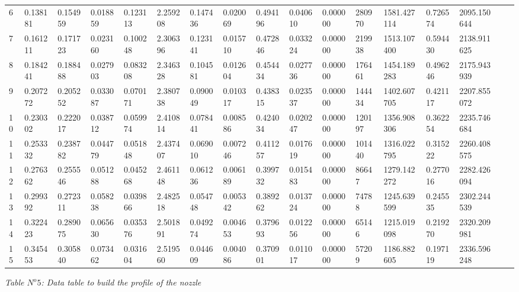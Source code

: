 \begin{center}
\begin{tabular}{|l*{16}{l|}}
6 & 0.138181 & 0.154959 & 0.018859 & 0.123113 & 2.259208 & 0.147436 & 0.020069 & 0.494196 & 0.040610 & 0.000000 & 280970 & 1581.427114 & 0.726574 & 2095.150644 \\
7 & 0.161211 & 0.171723 & 0.023160 & 0.100248 & 2.306396 & 0.123141 & 0.015710 & 0.472846 & 0.033224 & 0.000000 & 219938 & 1513.107400 & 0.594430 & 2138.911625 \\
8 & 0.184241 & 0.188488 & 0.027903 & 0.083208 & 2.346328 & 0.104581 & 0.012604 & 0.454434 & 0.027736 & 0.000000 & 176461 & 1454.189283 & 0.496246 & 2175.943939 \\
9 & 0.207272 & 0.205252 & 0.033087 & 0.070171 & 2.380738 & 0.090049 & 0.010317 & 0.438315 & 0.023537 & 0.000000 & 144434 & 1402.607705 & 0.421117 & 2207.855072 \\
10 & 0.230302 & 0.222017 & 0.038712 & 0.059974 & 2.410814 & 0.078441 & 0.008586 & 0.424034 & 0.020247 & 0.000000 & 120197 & 1356.908306 & 0.362254 & 2235.746684 \\
11 & 0.253332 & 0.238782 & 0.044779 & 0.051848 & 2.437407 & 0.069010 & 0.007246 & 0.411257 & 0.017619 & 0.000000 & 101440 & 1316.022795 & 0.315222 & 2260.408575 \\
12 & 0.276362 & 0.255546 & 0.051288 & 0.045268 & 2.461148 & 0.061236 & 0.006189 & 0.399732 & 0.015483 & 0.000000 & 86647 & 1279.142272 & 0.277016 & 2282.426094 \\
13 & 0.299392 & 0.272311 & 0.058238 & 0.039866 & 2.482518 & 0.054748 & 0.005342 & 0.389262 & 0.013724 & 0.000000 & 74788 & 1245.639599 & 0.245535 & 2302.244539 \\
14 & 0.322423 & 0.289075 & 0.065630 & 0.035376 & 2.501891 & 0.049274 & 0.004653 & 0.379693 & 0.012256 & 0.000000 & 65146 & 1215.019098 & 0.219270 & 2320.209981 \\
15 & 0.345453 & 0.305840 & 0.073462 & 0.031604 & 2.519560 & 0.044609 & 0.004086 & 0.370901 & 0.011017 & 0.000000 & 57209 & 1186.882605 & 0.197119 & 2336.596248 \\
\hline
\end{tabular}
\end{center}
\begin{flushright}
\textit{ Table $N^o 5$: Data table to build the profile of the nozzle } \\
\end{flushright}
